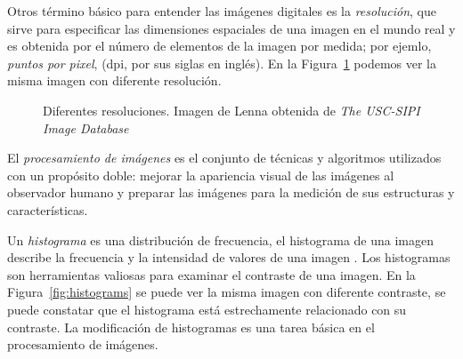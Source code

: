 Otros término básico para entender las imágenes digitales es la
\textit{resolución}, que sirve para especificar las dimensiones espaciales de
una imagen en el mundo real y es obtenida por el número de elementos de la
imagen por medida; por ejemlo, \textit{puntos por pixel}, (dpi, por sus siglas
en inglés). En la Figura~\ref{resolution} podemos ver la misma imagen con
diferente resolución.

\begin{figure}[h]
    \centering

  \caption[Resolución]{Diferentes resoluciones. Imagen de Lenna obtenida de
  \textit{The USC-SIPI Image Database}}
  
  \label{resolution}
\end{figure}

El \textit{procesamiento de imágenes} es el conjunto de técnicas y algoritmos
utilizados con un propósito doble: mejorar la apariencia visual de las imágenes
al observador humano y preparar las imágenes para la medición de sus
estructuras y características.

Un \textit{histograma} es una distribución de frecuencia, el histograma de una
imagen describe la frecuencia y la intensidad de valores de una imagen
\cite{burger2008digital}. Los histogramas son herramientas valiosas para
examinar el contraste de una imagen. En la Figura~\ref{fig:histograms} se puede
ver la misma imagen con diferente contraste, se puede constatar que el
histograma está estrechamente relacionado con su contraste. La modificación de
histogramas es una tarea básica en el procesamiento de imágenes.

